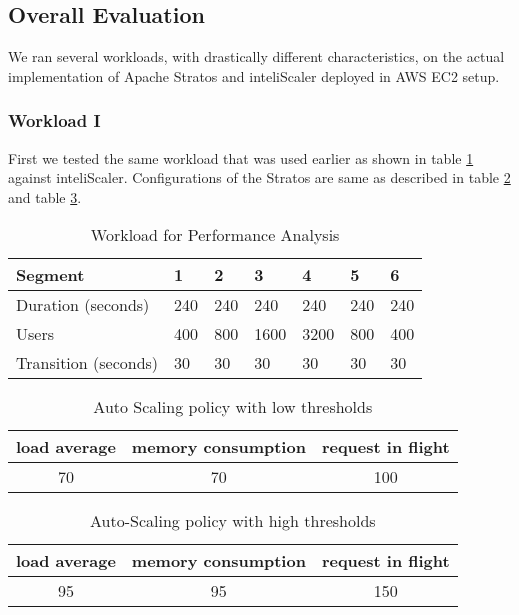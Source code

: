 \subsection{Overall Evaluation}

We ran several workloads, with drastically different characteristics, on the actual implementation of Apache Stratos and inteliScaler deployed in AWS EC2 setup.

\subsubsection{Workload I}
First we tested the same workload that was used earlier as shown in table \ref{table:analysis_workload} against inteliScaler. Configurations of the Stratos are same as described in table \ref{table:policy_low_threshold} and table \ref{table:policy_high_threshold}.

\begin{table}[h!]
\centering
\caption{Workload for Performance Analysis}
\label{table:analysis_workload}
\begin{tabular}{|l|l|l|l|l|l|l|}
\hline
Segment & 1 & 2 & 3 & 4 & 5 & 6\\ \hline
Duration (seconds) & 240 & 240 & 240 & 240 & 240 & 240 \\ \hline
Users & 400 & 800 & 1600 & 3200 & 800 & 400   \\ \hline
Transition (seconds) & 30 & 30 & 30 & 30 & 30 & 30 \\ \hline
\end{tabular}
\end{table}

\begin{table}[h!]
\centering
\caption{Auto Scaling policy with low thresholds}
\label{table:policy_low_threshold}
\begin{tabular}{|c|c|c|}
\hline
load average & memory consumption & request in flight \\ \hline
70 & 70 & 100\\ \hline
\end{tabular}
\end{table}

\begin{table}[h!]
\centering
\caption{Auto-Scaling policy with high thresholds}
\label{table:policy_high_threshold}
\begin{tabular}{|c|c|c|}
\hline
load average & memory consumption & request in flight \\ \hline
95 & 95 & 150\\ \hline
\end{tabular}
\end{table}